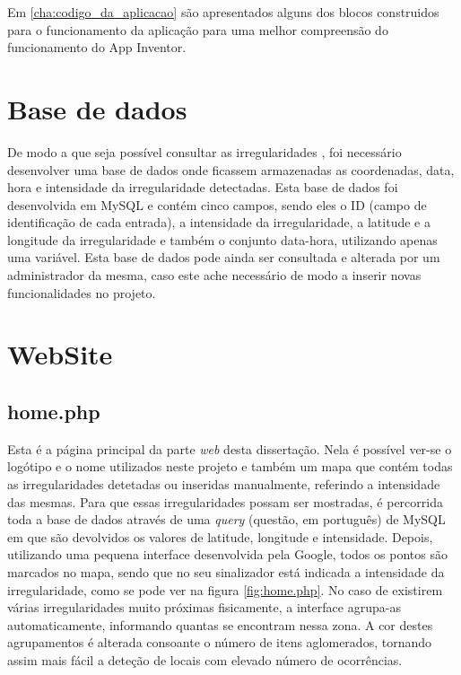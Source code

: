 Em \ref{cha:codigo_da_aplicacao} são apresentados alguns dos blocos construidos para o funcionamento da aplicação para uma melhor compreensão do funcionamento do App Inventor.
\newpage

\section{Base de dados}
\label{sec:Base_de_dados}

De modo a que seja possível consultar as irregularidades , foi necessário desenvolver uma base de dados onde ficassem armazenadas as coordenadas, data, hora e intensidade da irregularidade detectadas.
Esta base de dados foi desenvolvida em MySQL e contém cinco campos, sendo eles o ID (campo de identificação de cada entrada), a intensidade da irregularidade, a latitude e a longitude da irregularidade e também o conjunto data-hora, utilizando apenas uma variável.
Esta base de dados pode ainda ser consultada e alterada por um administrador da mesma, caso este ache necessário de modo a inserir novas funcionalidades no projeto.

\section{WebSite}
\label{sec:website}

\subsection{home.php}
\label{sub:home.php}

Esta é a página principal da parte \emph{web} desta dissertação.
Nela é possível ver-se o logótipo e o nome utilizados neste projeto e também um mapa que contém todas as irregularidades detetadas ou inseridas manualmente, referindo a intensidade das mesmas.
Para que essas irregularidades possam ser mostradas, é percorrida toda a base de dados através de uma \emph{query} (questão, em português) de MySQL em que são devolvidos os valores de latitude, longitude e intensidade.
Depois, utilizando uma pequena interface desenvolvida pela Google, todos os pontos são marcados no mapa, sendo que no seu sinalizador está indicada a intensidade da irregularidade, como se pode ver na figura \ref{fig:home.php}.
No caso de existirem várias irregularidades muito próximas fisicamente, a interface agrupa-as automaticamente, informando quantas se encontram nessa zona.
A cor destes agrupamentos é alterada consoante o número de itens aglomerados, tornando assim mais fácil a deteção de locais com elevado número de ocorrências.

